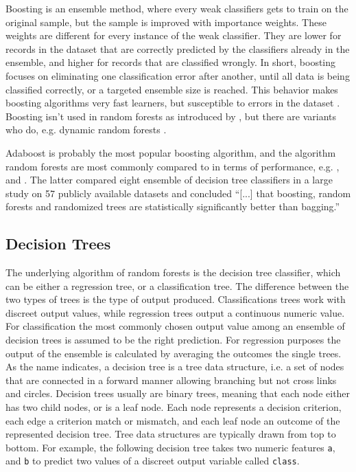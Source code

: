 \documentclass[a4paper,man,12pt,apacite,floatsintext,draftfirst]{apa6} %
\begin{document}
Boosting is an ensemble method, where every weak classifiers gets to train
on the original sample, but the sample is improved with importance weights.
These weights are different for every instance of the weak classifier.
They are lower for records in the dataset that are correctly predicted by
the classifiers already in the ensemble,
and higher for records that are classified wrongly.
In short, boosting focuses on eliminating one classification error after
another, until all data is being classified correctly,
or a targeted ensemble size is reached.
This behavior makes boosting algorithms very fast learners,
but susceptible to errors in the dataset \cite{long2010random}.
Boosting isn't used in random forests as introduced by \cite{breiman2001random},
but there are variants who do, e.g.
dynamic random forests \cite{bernard2012dynamic}.

Adaboost \cite{freund1995decision} is probably the most popular
boosting algorithm, and the algorithm random forests are most commonly
compared to in terms of performance, e.g. \cite{breiman2001random},
\cite{banfield2007comparison} and \cite{rodriguez2006rotation}.
The latter compared eight ensemble of decision tree classifiers in a
large study on 57 publicly available datasets and concluded
“[...] that boosting, random forests and randomized trees are
statistically significantly better than bagging.”

\subsection{Decision Trees}

The underlying algorithm of random forests is the decision tree classifier,
which can be either a regression tree, or a classification tree.
The difference between the two types of trees is the type of output produced.
Classifications trees work with discreet output values,
while regression trees output a continuous numeric value.
For classification the most commonly chosen output value among an ensemble
of decision trees is assumed to be the right prediction.
For regression purposes the output of the ensemble is calculated by averaging
the outcomes the single trees.
As the name indicates, a decision tree is a tree data structure, i.e.
a set of nodes that are connected in a forward manner allowing branching
but not cross links and circles.
Decision trees usually are binary trees, meaning that each node either has
two child nodes, or is a leaf node.
Each node represents a decision criterion, each edge a criterion match or
mismatch, and each leaf node an outcome of the represented decision tree.
Tree data structures are typically drawn from top to bottom.
For example, the following decision tree takes two numeric features
\texttt{a}, and \texttt{b} to predict two values of a discreet output variable
called \texttt{class}.
\end{document}
